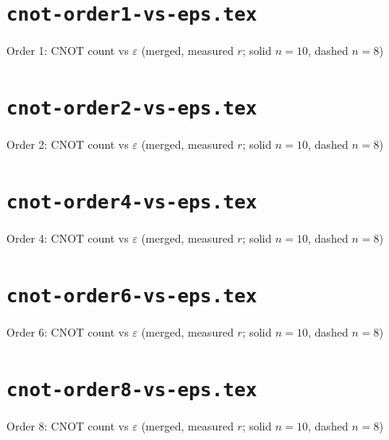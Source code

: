 \documentclass{article}
\begin{document}
\section*{\texttt{cnot-order1-vs-eps.tex}}
Order 1: CNOT count vs $\varepsilon$ (merged, measured $r$; solid $n=10$, dashed $n=8$)\par\medskip

\clearpage

\section*{\texttt{cnot-order2-vs-eps.tex}}
Order 2: CNOT count vs $\varepsilon$ (merged, measured $r$; solid $n=10$, dashed $n=8$)\par\medskip

\clearpage

\section*{\texttt{cnot-order4-vs-eps.tex}}
Order 4: CNOT count vs $\varepsilon$ (merged, measured $r$; solid $n=10$, dashed $n=8$)\par\medskip

\clearpage

\section*{\texttt{cnot-order6-vs-eps.tex}}
Order 6: CNOT count vs $\varepsilon$ (merged, measured $r$; solid $n=10$, dashed $n=8$)\par\medskip

\clearpage

\section*{\texttt{cnot-order8-vs-eps.tex}}
Order 8: CNOT count vs $\varepsilon$ (merged, measured $r$; solid $n=10$, dashed $n=8$)\par\medskip

\clearpage
\end{document}
